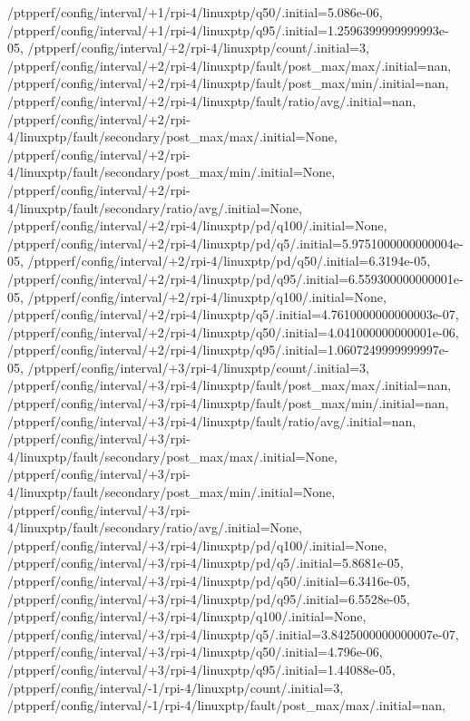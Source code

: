 {    /ptpperf/config/interval/+1/rpi-4/linuxptp/q50/.initial=5.086e-06,
    /ptpperf/config/interval/+1/rpi-4/linuxptp/q95/.initial=1.2596399999999993e-05,
    /ptpperf/config/interval/+2/rpi-4/linuxptp/count/.initial=3,
    /ptpperf/config/interval/+2/rpi-4/linuxptp/fault/post_max/max/.initial=nan,
    /ptpperf/config/interval/+2/rpi-4/linuxptp/fault/post_max/min/.initial=nan,
    /ptpperf/config/interval/+2/rpi-4/linuxptp/fault/ratio/avg/.initial=nan,
    /ptpperf/config/interval/+2/rpi-4/linuxptp/fault/secondary/post_max/max/.initial=None,
    /ptpperf/config/interval/+2/rpi-4/linuxptp/fault/secondary/post_max/min/.initial=None,
    /ptpperf/config/interval/+2/rpi-4/linuxptp/fault/secondary/ratio/avg/.initial=None,
    /ptpperf/config/interval/+2/rpi-4/linuxptp/pd/q100/.initial=None,
    /ptpperf/config/interval/+2/rpi-4/linuxptp/pd/q5/.initial=5.9751000000000004e-05,
    /ptpperf/config/interval/+2/rpi-4/linuxptp/pd/q50/.initial=6.3194e-05,
    /ptpperf/config/interval/+2/rpi-4/linuxptp/pd/q95/.initial=6.559300000000001e-05,
    /ptpperf/config/interval/+2/rpi-4/linuxptp/q100/.initial=None,
    /ptpperf/config/interval/+2/rpi-4/linuxptp/q5/.initial=4.7610000000000003e-07,
    /ptpperf/config/interval/+2/rpi-4/linuxptp/q50/.initial=4.041000000000001e-06,
    /ptpperf/config/interval/+2/rpi-4/linuxptp/q95/.initial=1.0607249999999997e-05,
    /ptpperf/config/interval/+3/rpi-4/linuxptp/count/.initial=3,
    /ptpperf/config/interval/+3/rpi-4/linuxptp/fault/post_max/max/.initial=nan,
    /ptpperf/config/interval/+3/rpi-4/linuxptp/fault/post_max/min/.initial=nan,
    /ptpperf/config/interval/+3/rpi-4/linuxptp/fault/ratio/avg/.initial=nan,
    /ptpperf/config/interval/+3/rpi-4/linuxptp/fault/secondary/post_max/max/.initial=None,
    /ptpperf/config/interval/+3/rpi-4/linuxptp/fault/secondary/post_max/min/.initial=None,
    /ptpperf/config/interval/+3/rpi-4/linuxptp/fault/secondary/ratio/avg/.initial=None,
    /ptpperf/config/interval/+3/rpi-4/linuxptp/pd/q100/.initial=None,
    /ptpperf/config/interval/+3/rpi-4/linuxptp/pd/q5/.initial=5.8681e-05,
    /ptpperf/config/interval/+3/rpi-4/linuxptp/pd/q50/.initial=6.3416e-05,
    /ptpperf/config/interval/+3/rpi-4/linuxptp/pd/q95/.initial=6.5528e-05,
    /ptpperf/config/interval/+3/rpi-4/linuxptp/q100/.initial=None,
    /ptpperf/config/interval/+3/rpi-4/linuxptp/q5/.initial=3.8425000000000007e-07,
    /ptpperf/config/interval/+3/rpi-4/linuxptp/q50/.initial=4.796e-06,
    /ptpperf/config/interval/+3/rpi-4/linuxptp/q95/.initial=1.44088e-05,
    /ptpperf/config/interval/-1/rpi-4/linuxptp/count/.initial=3,
    /ptpperf/config/interval/-1/rpi-4/linuxptp/fault/post_max/max/.initial=nan,
}
